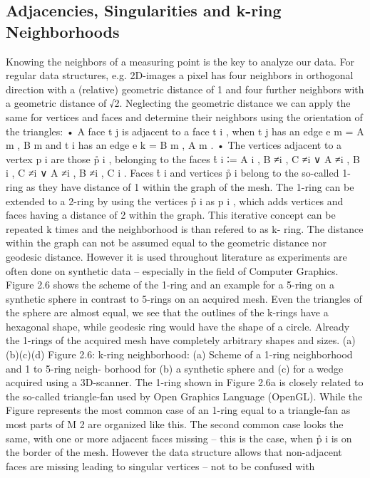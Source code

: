 \documentclass[openany]{book}
\begin{document}
\subsection{Adjacencies, Singularities and k-ring Neighborhoods}
Knowing the neighbors of a measuring point is the key to analyze our data. For regular
data structures, e.g. 2D-images a pixel has four neighbors in orthogonal direction with a
(relative) geometric distance of 1 and four further neighbors with a geometric distance of
√2. Neglecting the geometric distance we can apply the same for vertices and faces and
determine their neighbors using the orientation of the triangles:
• A face t j is adjacent to a face t i , when t j has an edge e m = {A m , B m } and t i has an
edge e k = {B m , A m }.
• The vertices adjacent to a vertex p i are those p̊ i , belonging to the
faces t̊ i ∶= {A i , B ≠i , C ≠i } ∨ {A ≠i , B i , C ≠i } ∨ {A ≠i , B ≠i , C i }.
Faces t̊ i and vertices p̊ i belong to the so-called 1-ring as they have distance of 1 within
the graph of the mesh. The 1-ring can be extended to a 2-ring by using the vertices
p̊ i as p i , which adds vertices and faces having a distance of 2 within the graph. This
iterative concept can be repeated k times and the neighborhood is than refered to as k-
ring. The distance within the graph can not be assumed equal to the geometric distance
nor geodesic distance. However it is used throughout literature as experiments are often
done on synthetic data – especially in the field of Computer Graphics. Figure 2.6 shows
the scheme of the 1-ring and an example for a 5-ring on a synthetic sphere in contrast to
5-rings on an acquired mesh. Even the triangles of the sphere are almost equal, we see
that the outlines of the k-rings have a hexagonal shape, while geodesic ring would have
the shape of a circle. Already the 1-rings of the acquired mesh have completely arbitrary
shapes and sizes.
(a)(b)(c)(d)
Figure 2.6: k-ring neighborhood: (a) Scheme of a 1-ring neighborhood and 1 to 5-ring neigh-
borhood for (b) a synthetic sphere and (c) for a wedge acquired using a 3D-scanner.
The 1-ring shown in Figure 2.6a is closely related to the so-called triangle-fan used
by Open Graphics Language (OpenGL). While the Figure represents the most common
case of an 1-ring equal to a triangle-fan as most parts of M 2 are organized like this. The
second common case looks the same, with one or more adjacent faces missing – this is
the case, when p̊ i is on the border of the mesh. However the data structure allows that
non-adjacent faces are missing leading to singular vertices – not to be confused with
\end{document}
